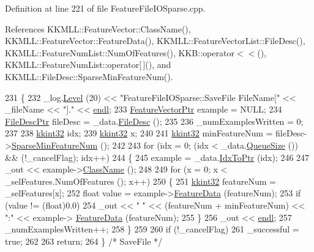 Definition at line 221 of file Feature\+File\+I\+O\+Sparse.\+cpp.



References K\+K\+M\+L\+L\+::\+Feature\+Vector\+::\+Class\+Name(), K\+K\+M\+L\+L\+::\+Feature\+Vector\+::\+Feature\+Data(), K\+K\+M\+L\+L\+::\+Feature\+Vector\+List\+::\+File\+Desc(), K\+K\+M\+L\+L\+::\+Feature\+Num\+List\+::\+Num\+Of\+Features(), K\+K\+B\+::operator$<$$<$(), K\+K\+M\+L\+L\+::\+Feature\+Num\+List\+::operator\mbox{[}$\,$\mbox{]}(), and K\+K\+M\+L\+L\+::\+File\+Desc\+::\+Sparse\+Min\+Feature\+Num().


\begin{DoxyCode}
231 \{
232   \_log.\hyperlink{class_k_k_b_1_1_run_log_a32cf761d7f2e747465fd80533fdbb659}{Level} (20) << \textcolor{stringliteral}{"FeatureFileIOSparse::SaveFile     FileName["} << \_fileName << \textcolor{stringliteral}{"]."} << 
      \hyperlink{namespace_k_k_b_ad1f50f65af6adc8fa9e6f62d007818a8}{endl};
233   \hyperlink{class_k_k_m_l_l_1_1_feature_vector}{FeatureVectorPtr}  example  = NULL;
234   \hyperlink{class_k_k_m_l_l_1_1_file_desc}{FileDescPtr}       fileDesc = \_data.\hyperlink{class_k_k_m_l_l_1_1_feature_vector_list_a736923be9c4ac7553a5aa87dd24efd16}{FileDesc} ();
235 
236   \_numExamplesWritten = 0;
237 
238   \hyperlink{namespace_k_k_b_a8fa4952cc84fda1de4bec1fbdd8d5b1b}{kkint32}  idx;
239   \hyperlink{namespace_k_k_b_a8fa4952cc84fda1de4bec1fbdd8d5b1b}{kkint32}  x;
240 
241   \hyperlink{namespace_k_k_b_a8fa4952cc84fda1de4bec1fbdd8d5b1b}{kkint32}  minFeatureNum = fileDesc->\hyperlink{class_k_k_m_l_l_1_1_file_desc_a5544aa7b42d2486b09b1dcfa08837367}{SparseMinFeatureNum} ();
242 
243   \textcolor{keywordflow}{for}  (idx = 0;  (idx < \_data.\hyperlink{class_k_k_b_1_1_k_k_queue_a1dab601f75ee6a65d97f02bddf71c40d}{QueueSize} ()) && (!\_cancelFlag);  idx++)
244   \{
245     example = \_data.\hyperlink{class_k_k_b_1_1_k_k_queue_acce2bdd8b3327e38266cf198382cd852}{IdxToPtr} (idx);
246 
247     \_out << example->\hyperlink{class_k_k_m_l_l_1_1_feature_vector_a7c410c4ab70f5f2fdc8fca66ea8000ba}{ClassName} ();
248 
249     \textcolor{keywordflow}{for}  (x = 0; x < \_selFeatures.NumOfFeatures (); x++)
250     \{
251       \hyperlink{namespace_k_k_b_a8fa4952cc84fda1de4bec1fbdd8d5b1b}{kkint32}  featureNum = \_selFeatures[x];
252       \textcolor{keywordtype}{float} value = example->\hyperlink{class_k_k_m_l_l_1_1_feature_vector_af055b7c725a4d80a31cd2f6606cc37b6}{FeatureData} (featureNum);
253       \textcolor{keywordflow}{if}  (value != (\textcolor{keywordtype}{float})0.0)
254         \_out << \textcolor{stringliteral}{" "} << (featureNum + minFeatureNum) << \textcolor{stringliteral}{":"} << example->
      \hyperlink{class_k_k_m_l_l_1_1_feature_vector_af055b7c725a4d80a31cd2f6606cc37b6}{FeatureData} (featureNum);
255     \}
256     \_out << \hyperlink{namespace_k_k_b_ad1f50f65af6adc8fa9e6f62d007818a8}{endl};
257     \_numExamplesWritten++;
258   \}
259 
260   \textcolor{keywordflow}{if}  (!\_cancelFlag)
261     \_successful = \textcolor{keyword}{true};
262 
263   \textcolor{keywordflow}{return};
264 \}  \textcolor{comment}{/* SaveFile */}
\end{DoxyCode}


